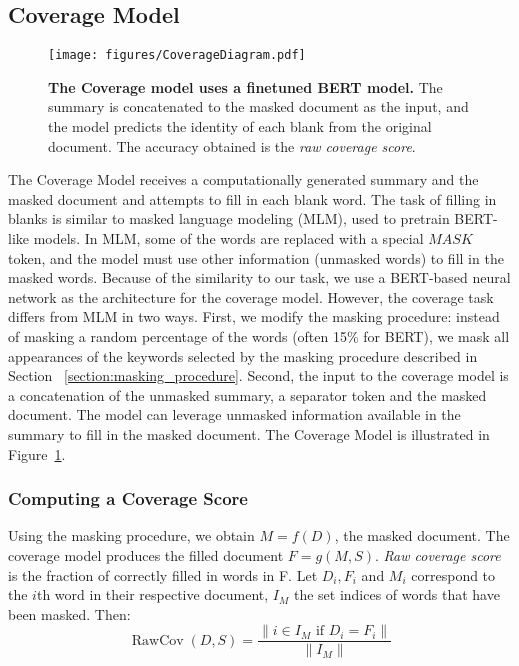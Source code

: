 \documentclass[11pt,a4paper]{article}
\DeclareMathOperator{\RawCov}{RawCov}
\begin{document}
\subsection{Coverage Model}
\label{section:coverage_model}

\begin{figure}
    \centering
    \texttt{[image: figures/CoverageDiagram.pdf]}
    \caption{\textbf{The Coverage model uses a finetuned BERT model.} The summary is concatenated to the masked document as the input, and the model predicts the identity of each blank from the original document. The accuracy obtained is the \textit{raw coverage score}.}
    \label{fig:coverage_diagram}
\end{figure}

The Coverage Model receives a computationally generated summary and the masked document and attempts to fill in each blank word. The task of filling in blanks is similar to masked language modeling (MLM), used to pretrain BERT-like \cite{devlin2019bert} models. In MLM, some of the words are replaced with a special $MASK$ token, and the model must use other information (unmasked words) to fill in the masked words.
Because of the similarity to our task, we use a BERT-based neural network as the architecture for the coverage model. However, the coverage task differs from MLM in two ways. First, we modify the masking procedure: instead of masking a random percentage of the words (often 15\% for BERT), we mask all appearances of the keywords selected by the masking procedure described in Section~ \ref{section:masking_procedure}. Second, the input to the coverage model is a concatenation of the unmasked summary, a separator token and the masked document. The model can leverage unmasked information available in the summary to fill in the masked document. The Coverage Model is illustrated in Figure~\ref{fig:coverage_diagram}.

\subsubsection{Computing a Coverage Score}

Using the masking procedure, we obtain $M=f(D)$, the masked document. The coverage model produces the filled document $F=g(M,S)$. \textit{Raw coverage score} is the fraction of correctly filled in words in F. Let $D_i, F_i$ and $M_i$ correspond to the $i$th word in their respective document, $I_M$ the set indices of words that have been masked. Then:
\begin{equation}
    \RawCov(D, S) = \frac{\|i \in I_M \text{ if } D_i = F_i \|}{\| I_M \|}
    \label{eqn:raw_coverage}
\end{equation}
\end{document}
